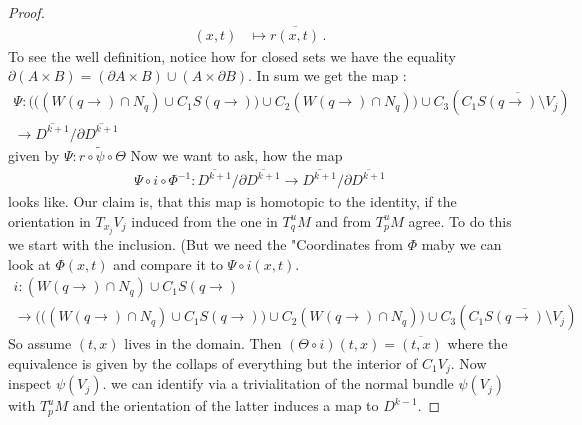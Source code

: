 \begin{proof}
\begin{align*}
	(x,t)		& \mapsto \overline{r(x,t)}\, .
\end{align*} To see the well definition, notice how for closed sets we have the equality $\partial(A\times B)=(\partial A \times B) \cup (A\times \partial B)$. 
In sum we get the map :
\begin{align*}
	\Psi: 	\Bigg( \Big( (W(q\to )\cap N_q)\cup C_1 S(q\to)\Big)\cup C_2 (W(q\to )\cap N_q)\Bigg)\cup  C_3 (C_1 \overline{S(q\to)\setminus V_j}) \\ 
	\to \overline{D^{k+1}} \big/ \partial \overline{D^{k+1}}
\end{align*} given by $\Psi: r \circ \tilde{\psi} \circ \Theta$
Now we want to ask, how the map 
\begin{align*}
	\Psi \circ i\circ \Phi^{-1}:\overline{D^{k+1}} \big/ \partial \overline{D^{k+1}} \to \overline{D^{k+1}} \big/ \partial \overline{D^{k+1}}
\end{align*} looks like. Our claim is, that this map is homotopic to the identity, if the orientation in $T_{x_j}V_j$ induced from the one in $T^u_qM$ and from $T^u_pM$ agree. 
To do this we start with the inclusion. (But we need the "Coordinates from $\Phi$ maby we can look at $\Phi(x,t)$ and compare it to $\Psi\circ i (x,t)$. 
\begin{align*}
	i: 	(W(q\to)\cap N_q)\cup C_1S(q\to)  \\
	\to 	\Bigg( \Big( (W(q\to )\cap N_q)\cup C_1 S(q\to)\Big)\cup C_2 (W(q\to )\cap N_q)\Bigg)\cup  C_3 (C_1 \overline{S(q\to)\setminus V_j})
\end{align*}So assume $(t,x)$ lives in the domain. Then 
$(\Theta\circ i )(t,x)=\overline{(t,x)}$ where the equivalence is given by the collaps of everything but the interior of $C_1V_j$. 	
Now inspect $\psi(V_j)$. we can identify via a trivialitation of the normal bundle $\psi(V_j)$ with $T^u_pM$ and the orientation of the latter induces a map to $D^{k-1}$. 

\end{proof}
	